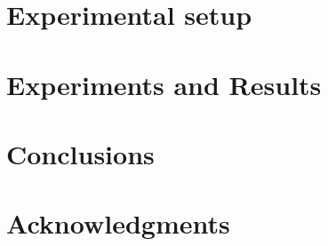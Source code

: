 \documentclass[conference]{IEEEtran}
\begin{document}

\section{Experimental setup}
\label{sec:exp}


\section{Experiments and Results}
\label{sec:res}


\section{Conclusions}


\section{Acknowledgments}





\newpage
\listoftodos[Notes]
\end{document}
